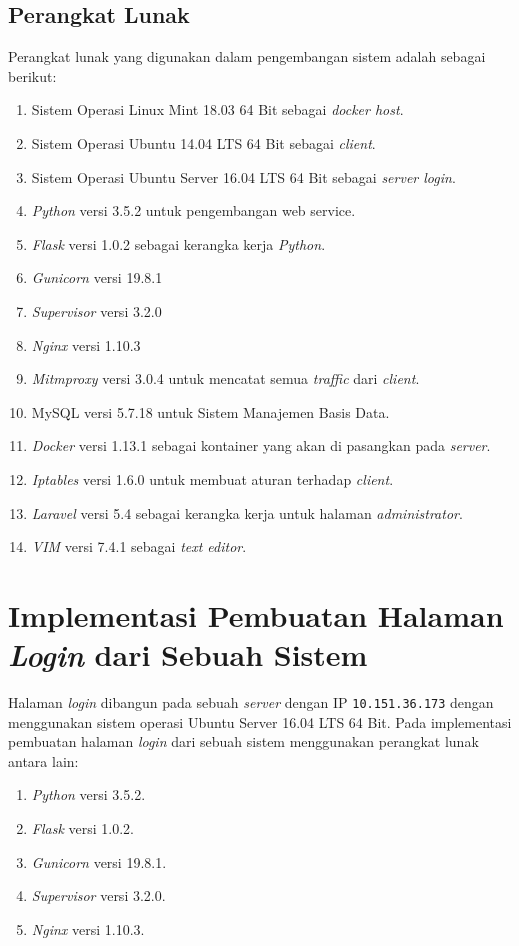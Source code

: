 \subsection{Perangkat Lunak}
Perangkat lunak yang digunakan dalam pengembangan sistem adalah sebagai berikut:
\begin{enumerate}
	\item Sistem Operasi Linux Mint 18.03 64 Bit sebagai \textit{docker host}.
	\item Sistem Operasi Ubuntu 14.04 LTS 64 Bit sebagai \textit{client}.
	\item Sistem Operasi Ubuntu Server 16.04 LTS 64 Bit sebagai \textit{server login}.
	\item \textit{Python} versi 3.5.2 untuk pengembangan web service. 
	\item \textit{Flask} versi 1.0.2 sebagai kerangka kerja \textit{Python}.
	\item \textit{Gunicorn} versi 19.8.1
	\item \textit{Supervisor} versi 3.2.0
	\item \textit{Nginx} versi 1.10.3
	\item \textit{Mitmproxy} versi 3.0.4 untuk mencatat semua \textit{traffic} dari \textit{client}.
	\item MySQL versi 5.7.18 untuk Sistem Manajemen Basis Data.
	\item \textit{Docker} versi 1.13.1 sebagai kontainer yang akan di pasangkan pada \textit{server}.
	\item \textit{Iptables} versi 1.6.0 untuk membuat aturan terhadap \textit{client}.
	\item \textit{Laravel} versi 5.4 sebagai kerangka kerja untuk halaman \textit{administrator}. 
	\item \textit{VIM} versi 7.4.1 sebagai \textit{text editor}.
\end{enumerate}

\section{Implementasi Pembuatan Halaman \textit{Login} dari Sebuah Sistem}
Halaman \textit{login} dibangun pada sebuah \textit{server} dengan IP \texttt{10.151.36.173} dengan menggunakan sistem operasi Ubuntu Server 16.04 LTS 64 Bit. Pada implementasi pembuatan halaman \textit{login} dari sebuah sistem menggunakan perangkat lunak antara lain:
\begin{enumerate}
	\item \textit{Python} versi 3.5.2.
	\item \textit{Flask} versi 1.0.2.
	\item \textit{Gunicorn} versi 19.8.1.
	\item \textit{Supervisor} versi 3.2.0.
	\item \textit{Nginx} versi 1.10.3.
\end{enumerate}

